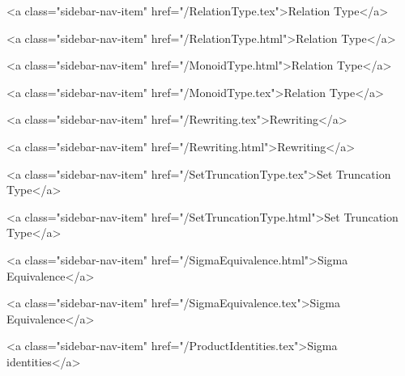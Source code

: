       
        
          <a class="sidebar-nav-item" href="/RelationType.tex">Relation Type</a>
        
      
    
      
        
          <a class="sidebar-nav-item" href="/RelationType.html">Relation Type</a>
        
      
    
      
        
          <a class="sidebar-nav-item" href="/MonoidType.html">Relation Type</a>
        
      
    
      
        
          <a class="sidebar-nav-item" href="/MonoidType.tex">Relation Type</a>
        
      
    
      
        
          <a class="sidebar-nav-item" href="/Rewriting.tex">Rewriting</a>
        
      
    
      
        
          <a class="sidebar-nav-item" href="/Rewriting.html">Rewriting</a>
        
      
    
      
        
          <a class="sidebar-nav-item" href="/SetTruncationType.tex">Set Truncation Type</a>
        
      
    
      
        
          <a class="sidebar-nav-item" href="/SetTruncationType.html">Set Truncation Type</a>
        
      
    
      
        
          <a class="sidebar-nav-item" href="/SigmaEquivalence.html">Sigma Equivalence</a>
        
      
    
      
        
          <a class="sidebar-nav-item" href="/SigmaEquivalence.tex">Sigma Equivalence</a>
        
      
    
      
        
          <a class="sidebar-nav-item" href="/ProductIdentities.tex">Sigma identities</a>
        
      
    
